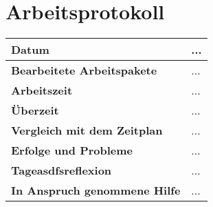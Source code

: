 \chapter{Arbeitsprotokoll}\label{ch:arbeitsprotokoll}
\renewcommand{\arraystretch}{1.5}
\begin{longtable}{p{}|p{}}
    \hline
    \textbf{Datum}                       & ...            \\
    \hline
    \textbf{Bearbeitete Arbeitspakete}   & ...                  \\
    \hline
    \textbf{Arbeitszeit}                 & ...                                    \\
    \hline
    \textbf{Überzeit}                    & ...                                    \\
    \hline
    \textbf{Vergleich mit dem Zeitplan}  & ... \\
    \hline
    \textbf{Erfolge und Probleme} & ...
    \\
    \hline
    \textbf{Tageasdfsreflexion} & ...
    \\
    \hline
    \textbf{In Anspruch genommene Hilfe} & ...                              \\
    \hline
\end{longtable}\label{tab:arbeitsprotokoll-...}
\newpage
